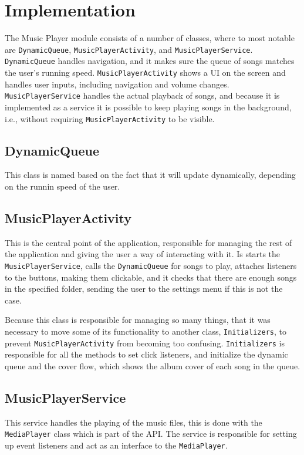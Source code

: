 \section{Implementation}
The Music Player module consists of a number of classes, where to most notable are \texttt{DynamicQueue}, \texttt{MusicPlayerActivity}, and \texttt{MusicPlayerService}. \texttt{DynamicQueue} handles navigation, and it makes sure the queue of songs matches the user's running speed. \texttt{MusicPlayerActivity} shows a UI on the screen and handles user inputs, including navigation and volume changes. \texttt{MusicPlayerService} handles the actual playback of songs, and because it is implemented as a service it is possible to keep playing songs in the background, i.e., without requiring \texttt{MusicPlayerActivity} to be visible.

\subsection{DynamicQueue}
\label{sec:dynamicQueue}
This class is named based on the fact that it will update dynamically, depending on the runnin speed of the user.

\subsection{MusicPlayerActivity}
This is the central point of the application, responsible for managing the rest of the application and giving the user a way of interacting with it. Is starts the \texttt{MusicPlayerService}, calls the \texttt{DynamicQueue} for songs to play, attaches listeners to the buttons, making them clickable, and it checks that there are enough songs in the specified folder, sending the user to the settings menu if this is not the case.

Because this class is responsible for managing so many things, that it was necessary to move some of its functionality to another class, \texttt{Initializers}, to prevent \texttt{MusicPlayerActivity} from becoming too confusing. \texttt{Initializers} is responsible for all the methods to set click listeners, and initialize the dynamic queue and the cover flow, which shows the album cover of each song in the queue.

\subsection{MusicPlayerService} 
This service handles the playing of the music files, this is done with the \texttt{MediaPlayer} class which is part of the \citet{android:MediaPlayer} API. The service is responsible for setting up event listeners and act as an interface to the \texttt{MediaPlayer}.  

